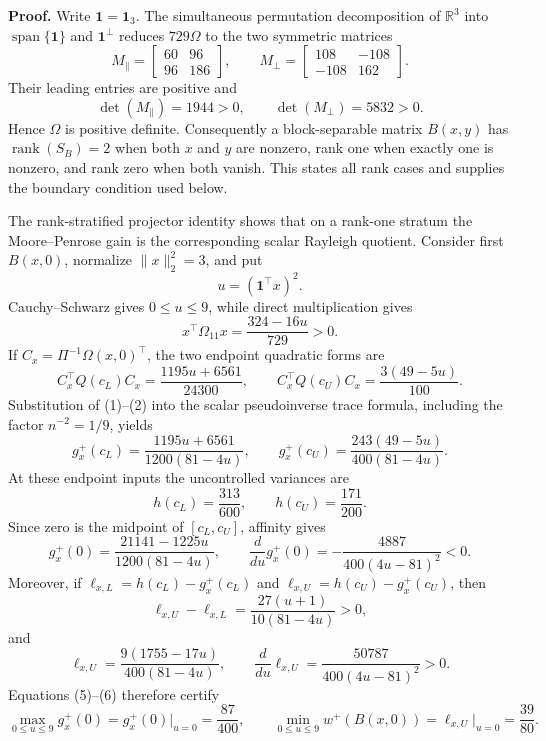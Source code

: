 \textbf{Proof.}
Write \(\mathbf 1=\mathbf 1_3\).  The simultaneous permutation decomposition of \(\mathbb R^3\) into \(\operatorname{span}\{\mathbf1\}\) and \(\mathbf1^\perp\) reduces \(729\Omega\) to the two symmetric matrices
\[
M_{\parallel}=\begin{bmatrix}60&96\\96&186\end{bmatrix},
\qquad
M_{\perp}=\begin{bmatrix}108&-108\\-108&162\end{bmatrix}.
\]
Their leading entries are positive and
\[
\det(M_{\parallel})=1944>0,
\qquad
\det(M_{\perp})=5832>0.
\]
Hence \(\Omega\) is positive definite.  Consequently a block-separable matrix \(B(x,y)\) has \(\operatorname{rank}(S_B)=2\) when both \(x\) and \(y\) are nonzero, rank one when exactly one is nonzero, and rank zero when both vanish.  This states all rank cases and supplies the boundary condition used below.

The rank-stratified projector identity shows that on a rank-one stratum the Moore--Penrose gain is the corresponding scalar Rayleigh quotient.  Consider first \(B(x,0)\), normalize \(\lVert x\rVert_2^2=3\), and put
\[
u=(\mathbf1^{\top}x)^2.
\]
Cauchy--Schwarz gives \(0\le u\le9\), while direct multiplication gives
\[
x^{\top}\Omega_{11}x=\frac{324-16u}{729}>0.
\tag{1}
\]
If \(C_x=\Pi^{-1}\Omega(x,0)^{\top}\), the two endpoint quadratic forms are
\[
C_x^{\top}Q(c_L)C_x=\frac{1195u+6561}{24300},
\qquad
C_x^{\top}Q(c_U)C_x=\frac{3(49-5u)}{100}.
\tag{2}
\]
Substitution of (1)--(2) into the scalar pseudoinverse trace formula, including the factor \(n^{-2}=1/9\), yields
\[
g_x^+(c_L)=\frac{1195u+6561}{1200(81-4u)},
\qquad
g_x^+(c_U)=\frac{243(49-5u)}{400(81-4u)}.
\tag{3}
\]
At these endpoint inputs the uncontrolled variances are
\[
h(c_L)=\frac{313}{600},
\qquad
h(c_U)=\frac{171}{200}.
\tag{4}
\]
Since zero is the midpoint of \([c_L,c_U]\), affinity gives
\[
g_x^+(0)=\frac{21141-1225u}{1200(81-4u)},
\qquad
\frac{d}{du}g_x^+(0)
=-\frac{4887}{400(4u-81)^2}<0.
\tag{5}
\]
Moreover, if \(\ell_{x,L}=h(c_L)-g_x^+(c_L)\) and \(\ell_{x,U}=h(c_U)-g_x^+(c_U)\), then
\[
\ell_{x,U}-\ell_{x,L}
=\frac{27(u+1)}{10(81-4u)}>0,
\]
and
\[
\ell_{x,U}=\frac{9(1755-17u)}{400(81-4u)},
\qquad
\frac{d}{du}\ell_{x,U}
=\frac{50787}{400(4u-81)^2}>0.
\tag{6}
\]
Equations (5)--(6) therefore certify
\[
\max_{0\le u\le9}g_x^+(0)=g_x^+(0)\big|_{u=0}=\frac{87}{400},
\qquad
\min_{0\le u\le9}w^+(B(x,0))
=\ell_{x,U}\big|_{u=0}=\frac{39}{80}.
\tag{7}
\]

